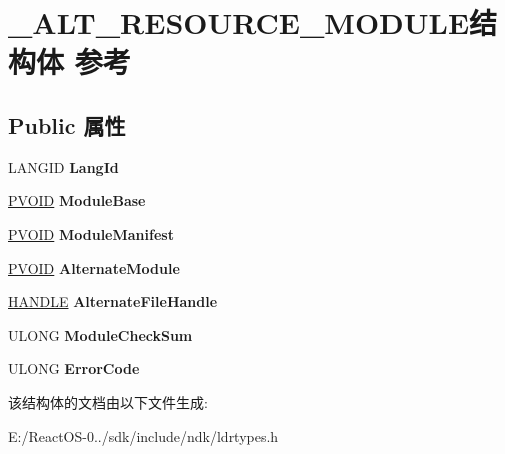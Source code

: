 \hypertarget{struct___a_l_t___r_e_s_o_u_r_c_e___m_o_d_u_l_e}{}\section{\+\_\+\+A\+L\+T\+\_\+\+R\+E\+S\+O\+U\+R\+C\+E\+\_\+\+M\+O\+D\+U\+L\+E结构体 参考}
\label{struct___a_l_t___r_e_s_o_u_r_c_e___m_o_d_u_l_e}
\subsection*{Public 属性}
\begin{DoxyCompactItemize}
\item 
\mbox{\label{struct___a_l_t___r_e_s_o_u_r_c_e___m_o_d_u_l_e_ac646ea20144f64babf3cbab6daffba54}} 
L\+A\+N\+G\+ID {\bfseries Lang\+Id}
\item 
\mbox{\label{struct___a_l_t___r_e_s_o_u_r_c_e___m_o_d_u_l_e_af0cfeef794c682daedc87a19a142af10}} 
\hyperlink{interfacevoid}{P\+V\+O\+ID} {\bfseries Module\+Base}
\item 
\mbox{\label{struct___a_l_t___r_e_s_o_u_r_c_e___m_o_d_u_l_e_afcdde2806403c4d59dd5cd137e9f4064}} 
\hyperlink{interfacevoid}{P\+V\+O\+ID} {\bfseries Module\+Manifest}
\item 
\mbox{\label{struct___a_l_t___r_e_s_o_u_r_c_e___m_o_d_u_l_e_a886b8202f4be9b075952abae145ef8dc}} 
\hyperlink{interfacevoid}{P\+V\+O\+ID} {\bfseries Alternate\+Module}
\item 
\mbox{\label{struct___a_l_t___r_e_s_o_u_r_c_e___m_o_d_u_l_e_aafc7c49e70990671d5e42bf81e48a526}} 
\hyperlink{interfacevoid}{H\+A\+N\+D\+LE} {\bfseries Alternate\+File\+Handle}
\item 
\mbox{\label{struct___a_l_t___r_e_s_o_u_r_c_e___m_o_d_u_l_e_a9fe7a2ed6ec7378a46ce418f205856fd}} 
U\+L\+O\+NG {\bfseries Module\+Check\+Sum}
\item 
\mbox{\label{struct___a_l_t___r_e_s_o_u_r_c_e___m_o_d_u_l_e_a74624bab3190d1042ccf356ab6d2b68b}} 
U\+L\+O\+NG {\bfseries Error\+Code}
\end{DoxyCompactItemize}


该结构体的文档由以下文件生成\+:\begin{DoxyCompactItemize}
\item 
E\+:/\+React\+O\+S-\/0../sdk/include/ndk/ldrtypes.\+h\end{DoxyCompactItemize}
